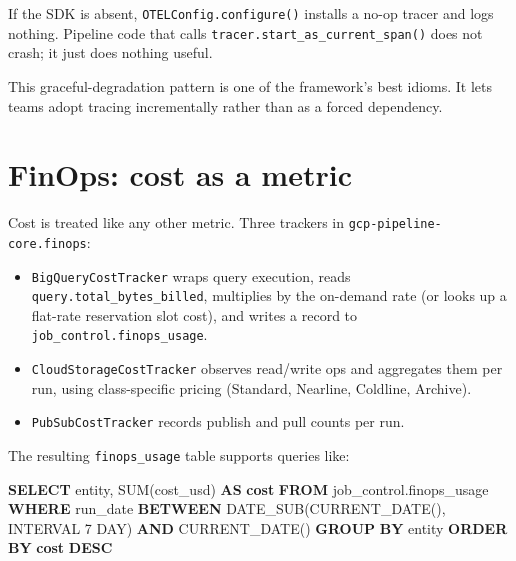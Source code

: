 \documentclass[
  11pt,
  british,
  oneside]{book}
\newenvironment{Shaded}{\begin{snugshade}}{\end{snugshade}}
\newcommand{\DataTypeTok}[1]{\textcolor[rgb]{0.13,0.29,0.53}{#1}}
\newcommand{\DecValTok}[1]{\textcolor[rgb]{0.00,0.00,0.81}{#1}}
\newcommand{\FunctionTok}[1]{\textcolor[rgb]{0.00,0.00,0.00}{#1}}
\newcommand{\KeywordTok}[1]{\textcolor[rgb]{0.13,0.29,0.53}{\textbf{#1}}}
\newcommand{\NormalTok}[1]{#1}
\providecommand{\tightlist}{%
  \setlength{\itemsep}{0pt}\setlength{\parskip}{0pt}}
\begin{document}
If the SDK is absent, \texttt{OTELConfig.configure()} installs a no-op
tracer and logs nothing. Pipeline code that calls
\texttt{tracer.start\_as\_current\_span()} does not crash; it just does
nothing useful.

This graceful-degradation pattern is one of the framework's best idioms.
It lets teams adopt tracing incrementally rather than as a forced
dependency.

\hypertarget{finops-cost-as-a-metric}{%
\section{FinOps: cost as a metric}\label{finops-cost-as-a-metric}}

Cost is treated like any other metric. Three
trackers in \texttt{gcp-pipeline-core.finops}:

\begin{itemize}
\tightlist
\item
  \texttt{BigQueryCostTracker} wraps query execution, reads
  \texttt{query.total\_bytes\_billed}, multiplies by the on-demand rate
  (or looks up a flat-rate reservation slot cost), and writes a record
  to \texttt{job\_control.finops\_usage}.
\item
  \texttt{CloudStorageCostTracker} observes read/write ops and
  aggregates them per run, using class-specific pricing (Standard,
  Nearline, Coldline, Archive).
\item
  \texttt{PubSubCostTracker} records publish and pull counts per run.
\end{itemize}

The resulting \texttt{finops\_usage} table supports queries like:

\begin{Shaded}
\begin{Highlighting}[]
\KeywordTok{SELECT}\NormalTok{ entity, }\FunctionTok{SUM}\NormalTok{(cost\_usd) }\KeywordTok{AS} \KeywordTok{cost}
\KeywordTok{FROM}\NormalTok{ job\_control.finops\_usage}
\KeywordTok{WHERE}\NormalTok{ run\_date }\KeywordTok{BETWEEN}\NormalTok{ DATE\_SUB(}\FunctionTok{CURRENT\_DATE}\NormalTok{(), }\DataTypeTok{INTERVAL} \DecValTok{7} \DataTypeTok{DAY}\NormalTok{) }\KeywordTok{AND} \FunctionTok{CURRENT\_DATE}\NormalTok{()}
\KeywordTok{GROUP} \KeywordTok{BY}\NormalTok{ entity}
\KeywordTok{ORDER} \KeywordTok{BY} \KeywordTok{cost} \KeywordTok{DESC}
\end{Highlighting}
\end{Shaded}
\end{document}
